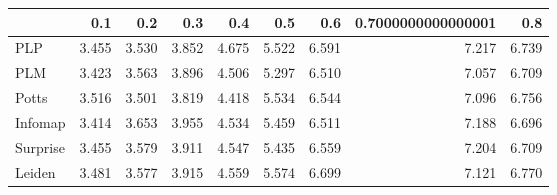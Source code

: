 \begin{tabular}{lrrrrrrrr}
\toprule
{} &   0.1 &   0.2 &   0.3 &   0.4 &   0.5 &   0.6 & 0.7000000000000001 &   0.8 \\
\midrule
PLP      & 3.455 & 3.530 & 3.852 & 4.675 & 5.522 & 6.591 &              7.217 & 6.739 \\
PLM      & 3.423 & 3.563 & 3.896 & 4.506 & 5.297 & 6.510 &              7.057 & 6.709 \\
Potts    & 3.516 & 3.501 & 3.819 & 4.418 & 5.534 & 6.544 &              7.096 & 6.756 \\
Infomap  & 3.414 & 3.653 & 3.955 & 4.534 & 5.459 & 6.511 &              7.188 & 6.696 \\
Surprise & 3.455 & 3.579 & 3.911 & 4.547 & 5.435 & 6.559 &              7.204 & 6.709 \\
Leiden   & 3.481 & 3.577 & 3.915 & 4.559 & 5.574 & 6.699 &              7.121 & 6.770 \\
\bottomrule
\end{tabular}
